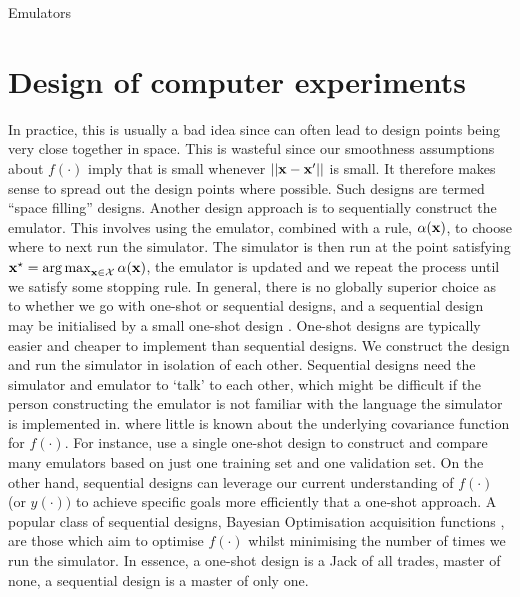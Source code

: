 \begin{chapter}{Emulators \label{Ch:Emulators}}
\section{Design of computer experiments}
 In practice, this is usually a bad idea since  can often lead to design points being very close together in space. This is wasteful since our smoothness assumptions about $f(\cdot)$ imply that  is small whenever $||\mathbf{x} - \mathbf{x}'||$ is small. It therefore makes sense to spread out the design points where possible. Such designs are termed ``space filling'' designs.
Another design approach is to sequentially construct the emulator. This involves using the emulator, combined with a rule, $\alpha(\mathbf{x})$, to choose where to next run the simulator. The simulator is then run at the point satisfying $\mathbf{x}^\star = \operatorname*{arg\,max}_{\mathbf{x} \in \mathcal{X}} \alpha(\mathbf{x})$, the emulator is updated and we repeat the process until we satisfy some stopping rule.
In general, there is no globally superior choice as to whether we go with one-shot or sequential designs, and a sequential design may be initialised by a small one-shot design \citep{Zhang2019}. One-shot designs are typically easier and cheaper to implement than sequential designs. We construct the design and run the simulator in isolation of each other. Sequential designs need the simulator and emulator to `talk' to each other, which might be difficult if the person constructing the emulator is not familiar with the language the simulator is implemented in.
 where little is known about the underlying covariance function for $f(\cdot)$. For instance, \citet{Overstall2017} use a single one-shot design to construct and compare many emulators based on just one training set and one validation set. On the other hand, sequential designs can leverage our current understanding of $f(\cdot)$ (or $y(\cdot))$ to achieve specific goals more efficiently that a one-shot approach. A popular class of sequential designs, Bayesian Optimisation acquisition functions \citep{Frazier2018}, are those which aim to optimise $f(\cdot)$ whilst minimising the number of times we run the simulator. In essence, a one-shot design is a Jack of all trades, master of none, a sequential design is a master of only one.

\end{chapter}
